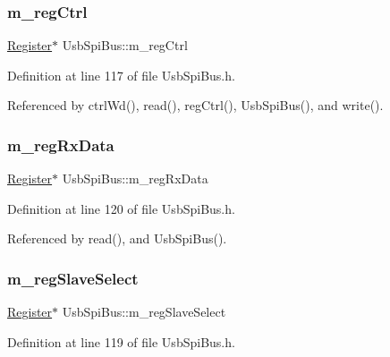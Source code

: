 \subsubsection{\texorpdfstring{m\+\_\+reg\+Ctrl}{m\_regCtrl}}
{\footnotesize\ttfamily \hyperlink{classRegister}{Register}$\ast$ Usb\+Spi\+Bus\+::m\+\_\+reg\+Ctrl\hspace{0.3cm}{\ttfamily [private]}}



Definition at line 117 of file Usb\+Spi\+Bus.\+h.



Referenced by ctrl\+Wd(), read(), reg\+Ctrl(), Usb\+Spi\+Bus(), and write().

\mbox{\label{classUsbSpiBus_ab59fb8ae67f97818d8cc6e0daf324cf6}} 
\subsubsection{\texorpdfstring{m\+\_\+reg\+Rx\+Data}{m\_regRxData}}
{\footnotesize\ttfamily \hyperlink{classRegister}{Register}$\ast$ Usb\+Spi\+Bus\+::m\+\_\+reg\+Rx\+Data\hspace{0.3cm}{\ttfamily [private]}}



Definition at line 120 of file Usb\+Spi\+Bus.\+h.



Referenced by read(), and Usb\+Spi\+Bus().

\mbox{\label{classUsbSpiBus_a5cdebdc06a79322c0802fbc523cade91}} 
\subsubsection{\texorpdfstring{m\+\_\+reg\+Slave\+Select}{m\_regSlaveSelect}}
{\footnotesize\ttfamily \hyperlink{classRegister}{Register}$\ast$ Usb\+Spi\+Bus\+::m\+\_\+reg\+Slave\+Select\hspace{0.3cm}{\ttfamily [private]}}



Definition at line 119 of file Usb\+Spi\+Bus.\+h.



